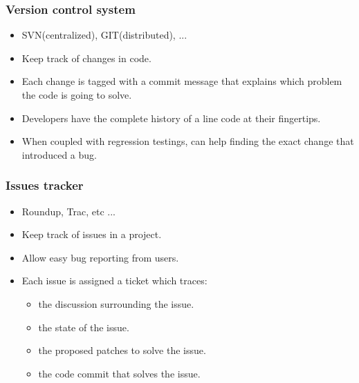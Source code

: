 \documentclass[10pt, handout]{beamer}
\begin{document}
\begin{frame}[fragile]
  \frametitle{Version control system}
  \begin{itemize}
  \item SVN(centralized), GIT(distributed), ...
  \item Keep track of changes in code.
  \item Each change is tagged with a commit message that explains which problem
    the code is going to solve.
  \item Developers have the complete history of a line code at their
    fingertips.
  \item When coupled with regression testings, can help finding the exact change
    that introduced a bug.
  \end{itemize}
\end{frame}

\begin{frame}[fragile]
  \frametitle{Issues tracker}
  \begin{itemize}
    \item Roundup, Trac, etc ...
  \item Keep track of issues in a project.
  \item Allow easy bug reporting from users.
  \item Each issue is assigned a ticket which traces:
    \begin{itemize}
    \item the discussion surrounding the issue.
    \item the state of the issue.
    \item the proposed patches to solve the issue.
    \item the code commit that solves the issue.
    \end{itemize}
  \end{itemize}
\end{frame}
\end{document}
